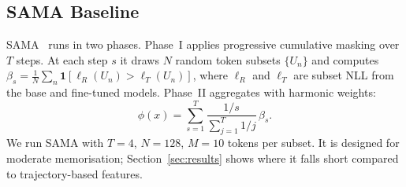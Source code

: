 \subsection{SAMA Baseline}

SAMA~\citep{shi2025sama} runs in two phases.
Phase~I applies progressive cumulative masking over $T$ steps.
At each step $s$ it draws $N$ random token subsets $\{U_n\}$ and computes
$\beta_s = \frac{1}{N}\sum_n \mathbf{1}[\ell_R(U_n) > \ell_T(U_n)]$,
where $\ell_R$ and $\ell_T$ are subset NLL from the base and fine-tuned models.
Phase~II aggregates with harmonic weights:
\begin{equation}
  \phi(x) = \sum_{s=1}^{T} \frac{1/s}{\sum_{j=1}^{T} 1/j}\,\beta_s.
\end{equation}
We run SAMA with $T=4$, $N=128$, $M=10$ tokens per subset.
It is designed for moderate memorisation; Section~\ref{sec:results} shows
where it falls short compared to trajectory-based features.
